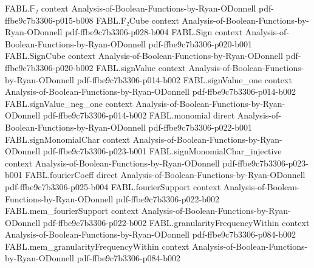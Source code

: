 \begin{theorem}
\label{FABL.blrCSPPredicate_eval}
\leanok
{}
\proofstep
  {FABL.𝔽₂}
  {context}
  {Analysis-of-Boolean-Functions-by-Ryan-ODonnell}
  {pdf-ffbe9c7b3306-p015-b008}
\proofstep
  {FABL.F₂Cube}
  {context}
  {Analysis-of-Boolean-Functions-by-Ryan-ODonnell}
  {pdf-ffbe9c7b3306-p028-b004}
\proofstep
  {FABL.Sign}
  {context}
  {Analysis-of-Boolean-Functions-by-Ryan-ODonnell}
  {pdf-ffbe9c7b3306-p020-b001}
\proofstep
  {FABL.SignCube}
  {context}
  {Analysis-of-Boolean-Functions-by-Ryan-ODonnell}
  {pdf-ffbe9c7b3306-p020-b002}
\proofstep
  {FABL.signValue}
  {context}
  {Analysis-of-Boolean-Functions-by-Ryan-ODonnell}
  {pdf-ffbe9c7b3306-p014-b002}
\proofstep
  {FABL.signValue_one}
  {context}
  {Analysis-of-Boolean-Functions-by-Ryan-ODonnell}
  {pdf-ffbe9c7b3306-p014-b002}
\proofstep
  {FABL.signValue_neg_one}
  {context}
  {Analysis-of-Boolean-Functions-by-Ryan-ODonnell}
  {pdf-ffbe9c7b3306-p014-b002}
\proofstep
  {FABL.monomial}
  {direct}
  {Analysis-of-Boolean-Functions-by-Ryan-ODonnell}
  {pdf-ffbe9c7b3306-p022-b001}
\proofstep
  {FABL.signMonomialChar}
  {context}
  {Analysis-of-Boolean-Functions-by-Ryan-ODonnell}
  {pdf-ffbe9c7b3306-p023-b001}
\proofstep
  {FABL.signMonomialChar_injective}
  {context}
  {Analysis-of-Boolean-Functions-by-Ryan-ODonnell}
  {pdf-ffbe9c7b3306-p023-b001}
\proofstep
  {FABL.fourierCoeff}
  {direct}
  {Analysis-of-Boolean-Functions-by-Ryan-ODonnell}
  {pdf-ffbe9c7b3306-p025-b004}
\proofstep
  {FABL.fourierSupport}
  {context}
  {Analysis-of-Boolean-Functions-by-Ryan-ODonnell}
  {pdf-ffbe9c7b3306-p022-b002}
\proofstep
  {FABL.mem_fourierSupport}
  {context}
  {Analysis-of-Boolean-Functions-by-Ryan-ODonnell}
  {pdf-ffbe9c7b3306-p022-b002}
\proofstep
  {FABL.granularityFrequencyWithin}
  {context}
  {Analysis-of-Boolean-Functions-by-Ryan-ODonnell}
  {pdf-ffbe9c7b3306-p084-b002}
\proofstep
  {FABL.mem_granularityFrequencyWithin}
  {context}
  {Analysis-of-Boolean-Functions-by-Ryan-ODonnell}
  {pdf-ffbe9c7b3306-p084-b002}

\end{theorem}
